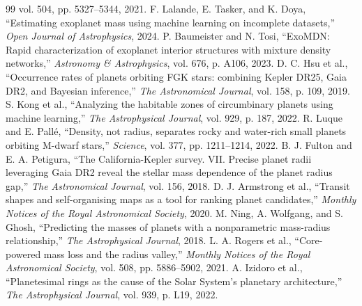 \documentclass[conference]{IEEEtran}
\begin{document}
\begin{thebibliography}{99}
vol. 504, pp. 5327--5344, 2021.
F. Lalande, E. Tasker, and K. Doya,
``Estimating exoplanet mass using machine learning on incomplete
datasets,''
\textit{Open Journal of Astrophysics}, 2024.
P. Baumeister and N. Tosi,
``ExoMDN: Rapid characterization of exoplanet interior structures
with mixture density networks,''
\textit{Astronomy \& Astrophysics}, vol. 676, p. A106, 2023.
D. C. Hsu et al.,
``Occurrence rates of planets orbiting FGK stars: combining Kepler
DR25, Gaia DR2, and Bayesian inference,''
\textit{The Astronomical Journal}, vol. 158, p. 109, 2019.
S. Kong et al.,
``Analyzing the habitable zones of circumbinary planets using
machine learning,''
\textit{The Astrophysical Journal}, vol. 929, p. 187, 2022.
R. Luque and E. Pall\'{e},
``Density, not radius, separates rocky and water-rich small planets
orbiting M-dwarf stars,''
\textit{Science}, vol. 377, pp. 1211--1214, 2022.
B. J. Fulton and E. A. Petigura,
``The California-Kepler survey. VII. Precise planet radii leveraging
Gaia DR2 reveal the stellar mass dependence of the planet radius gap,''
\textit{The Astronomical Journal}, vol. 156, 2018.
D. J. Armstrong et al.,
``Transit shapes and self-organising maps as a tool for ranking
planet candidates,''
\textit{Monthly Notices of the Royal Astronomical Society}, 2020.
M. Ning, A. Wolfgang, and S. Ghosh,
``Predicting the masses of planets with a nonparametric mass-radius
relationship,''
\textit{The Astrophysical Journal}, 2018.
L. A. Rogers et al.,
``Core-powered mass loss and the radius valley,''
\textit{Monthly Notices of the Royal Astronomical Society},
vol. 508, pp. 5886--5902, 2021.
A. Izidoro et al.,
``Planetesimal rings as the cause of the Solar System's planetary
architecture,''
\textit{The Astrophysical Journal}, vol. 939, p. L19, 2022.

\end{thebibliography}
\end{document}
